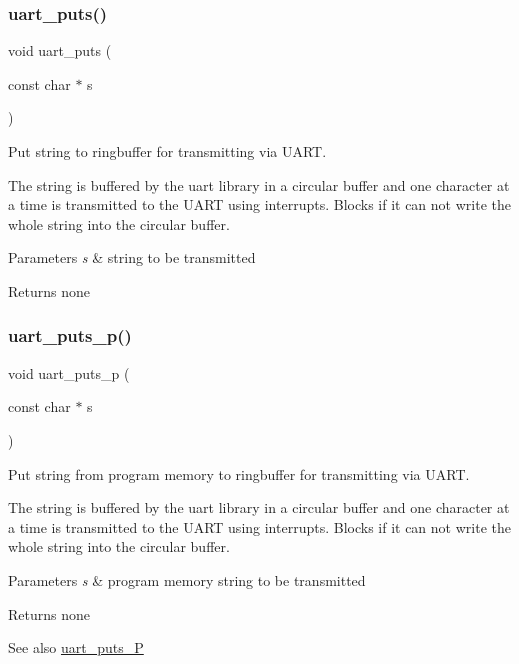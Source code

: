 \subsubsection{\texorpdfstring{uart\+\_\+puts()}{uart\_puts()}}
{\footnotesize\ttfamily void uart\+\_\+puts (\begin{DoxyParamCaption}\item[{const char $\ast$}]{s }\end{DoxyParamCaption})}



Put string to ringbuffer for transmitting via U\+A\+RT. 

The string is buffered by the uart library in a circular buffer and one character at a time is transmitted to the U\+A\+RT using interrupts. Blocks if it can not write the whole string into the circular buffer.


\begin{DoxyParams}{Parameters}
{\em s} & string to be transmitted \\
\hline
\end{DoxyParams}
\begin{DoxyReturn}{Returns}
none 
\end{DoxyReturn}
\mbox{\label{group__pfleury__uart_ga6d78b6744db6232f52b4616402036c2f}} 
\subsubsection{\texorpdfstring{uart\+\_\+puts\+\_\+p()}{uart\_puts\_p()}}
{\footnotesize\ttfamily void uart\+\_\+puts\+\_\+p (\begin{DoxyParamCaption}\item[{const char $\ast$}]{s }\end{DoxyParamCaption})}



Put string from program memory to ringbuffer for transmitting via U\+A\+RT. 

The string is buffered by the uart library in a circular buffer and one character at a time is transmitted to the U\+A\+RT using interrupts. Blocks if it can not write the whole string into the circular buffer.


\begin{DoxyParams}{Parameters}
{\em s} & program memory string to be transmitted \\
\hline
\end{DoxyParams}
\begin{DoxyReturn}{Returns}
none 
\end{DoxyReturn}
\begin{DoxySeeAlso}{See also}
\hyperlink{group__pfleury__uart_gae9e143569df2285379bc55f9f5595bf9}{uart\+\_\+puts\+\_\+P} 
\end{DoxySeeAlso}
